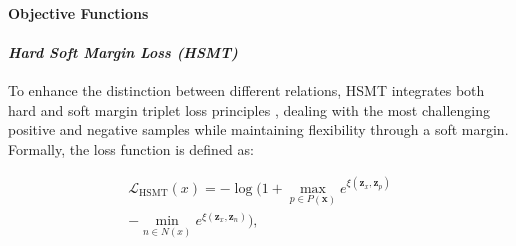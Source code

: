 


\paragraph{Objective Functions}
\label{sec:loss}
\paragraph{\textit{Hard Soft Margin Loss (HSMT)}} 
To enhance the distinction between different relations, HSMT integrates both hard and soft margin triplet loss principles \citep{hermans2017defense}, dealing with the most challenging positive and negative samples while maintaining flexibility through a soft margin. Formally, the loss function is defined as:

\begin{multline}
\mathcal{L}_{\textrm{HSMT}}({x}) = 
- \log \bigg(1 + \max_{{p} \in P(\bm{x})} e^{\xi(\bm{z}_x, \bm{z}_p)} \\
- \min_{{n} \in N({x})} e^{\xi(\bm{z}_x, \bm{z}_n)}
\bigg),
\end{multline}

